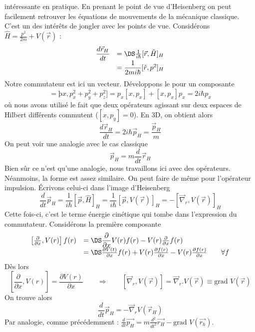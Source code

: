 intéressante en pratique. En prenant le point de vue d'Heisenberg on peut facilement 
retrouver les équations de mouvements de la mécanique classique. C'est un des intérêts de 
jongler avec les points de vue. Considérons $\hat{H}=\frac{p^2}{2m}+V(\vec{r})$ :
\begin{equation}
\begin{array}{ll}
\dfrac{d\vec{r}_H}{dt} &=\DS \frac{1}{i\hbar}[\vec{r},\hat{H}]_H\\
&= \dfrac{1}{2m i\hbar}[\hat{r},p^2]_H
\end{array}
\end{equation}
Notre commutateur est ici un vecteur. Développons le pour un composante
\begin{equation}
[x,p^2] = þx, p_x^2+p_y^2+p_z^2] = p_x[x,p_x]+[x,p_x]p_x = 2i\hbar p_x
\end{equation}
où nous avons utilisé le fait que deux opérateurs agissant sur deux espaces de Hilbert différents 
commutent ($[x,p_y]=0$). En 3D, on obtient alors
\begin{equation}
\dfrac{d\vec{r}_H}{dt} = 2i\hbar \vec{p}_H = \dfrac{\vec{p}_H}{m}
\end{equation}
On peut voir une analogie avec le cas classique
\begin{equation}
\vec{p}_H = m\dfrac{d}{dt}\vec{r}_H 
\end{equation}
Bien sûr ce n'est qu'une analogie, nous travaillons ici avec des opérateurs. Néanmoins, la forme est 
assez similaire. On peut faire de même pour l'opérateur impulsion. Écrivons celui-ci dans l'image 
d'Heisenberg
\begin{equation}
\dfrac{d}{dt}\vec{p}_H = \dfrac{1}{i\hbar}[\vec{p},\hat{H}]_H = \frac{1}{i\hbar}[\vec{p},V(\vec{r})]_H =
-[\vec{\nabla}_r,V(\vec{r})]_H
\end{equation}
Cette fois-ci, c'est le terme énergie cinétique qui tombe dans l'expression du commutateur.  Considérons 
la première composante
\begin{equation}
\begin{array}{ll}
\left[\frac{\partial}{\partial x}, V(r)\right]f(r) &=\DS \dfrac{\partial}{\partial x}V(r)f(r) - V(r)\frac{
\partial}{\partial x}f(r)\\
&=\DS \frac{\partial V(t)}{\partial x}f(r) + V(r)\frac{\partial f(r)}{\partial x}-V(r)\frac{\partial f(r)}{\partial x}\qquad \forall f
\end{array}
\end{equation}
Dès lors
\begin{equation}
\left[\frac{\partial}{\partial x}, V(r)\right] = \dfrac{\partial V(r)}{\partial x} \qquad \Longrightarrow\qquad
[\vec{\nabla}_r,V(\vec{r})] = \vec{\nabla}_r.V(\vec{r}) \equiv \text{grad } V(\vec{r})
\end{equation}
On trouve alors 
\begin{equation}
\dfrac{d}{dt}\vec{p}_H = -\vec{\nabla}_rV(\vec{r}_H)
\end{equation}
Par analogie, comme précédemment : $\frac{d}{dt}\vec{p_H} =m\frac{d^2}{dt^2}\vec{r_H} -\text{grad }V(\vec{r_h})$.


